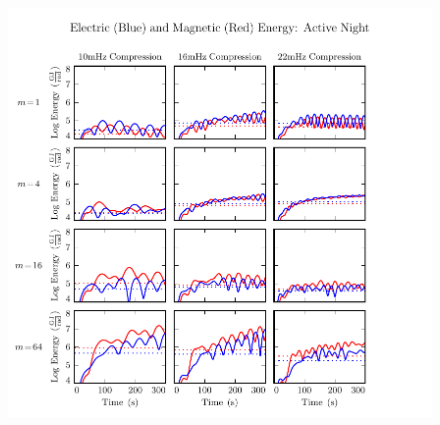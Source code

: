 \begin{figure}[H]
    \centering
    \includegraphics[width=\textwidth]{figures/UB_UE_B_3.pdf}
    \caption[Compression-Driven Electric and Magnetic Energy: Active Night]{}
    \label{fig_UB_UE_B_3}
\end{figure}











